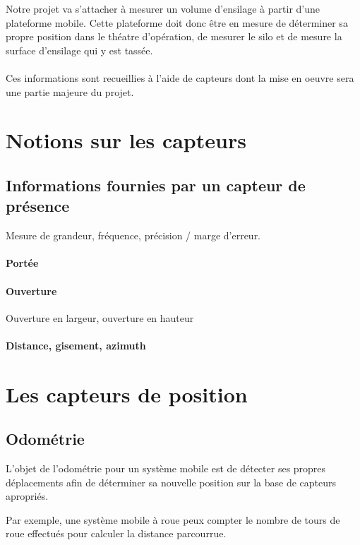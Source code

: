 \documentclass[12pt,a4paper]{report}
\begin{document}
Notre projet va s'attacher à mesurer un volume d'ensilage à partir d'une plateforme mobile. Cette plateforme doit donc être en mesure de déterminer sa propre position dans le théatre d'opération, de mesurer le silo et de mesure la surface d'ensilage qui y est tassée.

\paragraph{} Ces informations sont recueillies à l'aide de capteurs dont la mise en oeuvre sera une partie majeure du projet.

\section{Notions sur les capteurs}

\subsection{Informations fournies par un capteur de présence}

Mesure de grandeur, fréquence, précision / marge d'erreur.

\paragraph{Portée}
\paragraph{Ouverture} Ouverture en largeur, ouverture en hauteur

\paragraph{Distance, gisement, azimuth}




\section{Les capteurs de position}

\subsection{Odométrie}
L'objet de l'odométrie pour un système mobile est de détecter ses propres déplacements afin de déterminer sa nouvelle position sur la base de capteurs apropriés.


Par exemple, une système mobile à roue peux compter le nombre de tours de roue effectués pour calculer la distance parcourrue.
\end{document}
